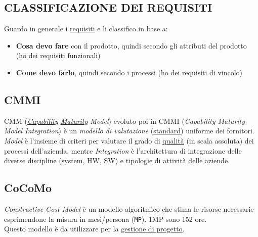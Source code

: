 		\subsection{CLASSIFICAZIONE DEI REQUISITI}  \label{classificazione}
		Guardo in generale i \underline{\hyperref[requirements]{requisiti}} e li classifico in base a:
		\begin{itemize}
			\item \textbf{Cosa devo fare} con il prodotto, quindi secondo gli attributi del prodotto (ho dei requisiti funzionali)
			\item \textbf{Come devo farlo}, quindi secondo i processi (ho dei requisiti di vincolo)
		\end{itemize}

		\subsection{CMMI}	 \label{cmmi} %
		CMM (\textit{\underline{\hyperref[capability]{Capability}} \underline{\hyperref[maturita]{Maturity}} Model}) evoluto poi in CMMI (\textit{Capability Maturity Model Integration}) è un \textit{modello di valutazione} (\underline{\hyperref[standard]{standard}}) uniforme dei fornitori. \\
		\textit{Model} è l'insieme di criteri per valutare il grado di \underline{\hyperref[qualita]{qualità}} (in scala assoluta) dei processi dell’azienda, mentre \textit{Integration} è l'architettura di integrazione delle diverse discipline (system, HW, SW) e tipologie di attività delle aziende.

		\subsection{CoCoMo}	 \label{cocomo}
		\textit{Constructive Cost Model} è un modello algoritmico che stima le risorse necessarie esprimendone la misura in mesi/persona (\texttt{MP}). 1MP sono 152 ore. \\
		Questo modello è da utilizzare per la \underline{\hyperref[gestioneprogetto]{gestione di progetto}}.


